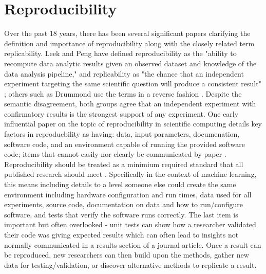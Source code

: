  \section{Reproducibility}
 Over the past 18 years, there has been several significant papers clarifying the definition and importance of reproducibility along with the closely related term replicability. Leek and Peng have defined reproducibility as the "ability to recompute data analytic results given an observed dataset and knowledge of the data analysis pipeline," and replicability as "the chance that an independent experiment targeting the same scientific question will produce a consistent result" \cite{leek_opinion_2015}; others such as Drummond use the terms in a reverse fashion \cite{drummond_replicability_2009}. Despite the semantic disagreement, both groups agree that an independent experiment with confirmatory results is the strongest support of any experiment. One early influential paper on the topic of reproducibility in scientific computing details key factors in reproducbility as having: data, input parameters, documenation, software code, and an environment capable of running the provided software code; items that cannot easily nor clearly be communicated by paper \cite{schwab_making_2000}. Reproducibility should be treated as a minimium required standard that all published research should meet \cite{peng_reproducible_2006}. Specifically in the context of machine learning, this means including details to a level someone else could create the same environment including hardware configuration and run times, data used for all experiments, source code, documentation on data and how to run/configure software, and tests that verify the software runs correctly. The last item is important but often overlooked - unit tests can show how a researcher validated their code was giving expected results which can often lead to insights not normally communicated in a results section of a journal article. Once a result can be reproduced, new researchers can then build upon the methods, gather new data for testing/validation, or discover alternative methods to replicate a result.
 
 
